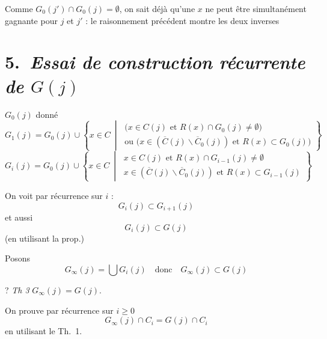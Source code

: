 \documentclass[11pt,a4paper]{article}
\begin{document}
Comme $G_0(j')\cap G_0(j)=\emptyset$, on sait déjà qu'une $x$ ne peut être simultanément gagnante pour $j$ et $j'$ : le raisonnement précédent montre   les deux inverses

\section*{ 5.\ \emph{Essai de construction récurrente de $G(j)$}}


$G_0(j)$ donné
\[
  G_1(j)=G_0(j)\cup\left\{x\in C\ \middle|\ \begin{array}{l}
    \bigl(x\in C(j) \text{ et } R(x)\cap G_0(j)\neq\emptyset\bigr)\\
    \text{ou } \bigl(x\in(\overline{C}(j)\smallsetminus\overline{C}_0(j)) \text{ et } R(x)\subset G_0(j)\bigr)
  \end{array}\right\}
\]
\[
  G_i(j)=G_0(j)\cup\left\{x\in C\ \middle|\ \begin{array}{l}
    x\in C(j) \text{ et } R(x)\cap G_{i-1}(j)\neq\emptyset\\
    x\in(\overline{C}(j)\smallsetminus\overline{C}_0(j)) \text{ et } R(x)\subset G_{i-1}(j)
  \end{array}\right\}
\]

On voit par récurrence sur $i$ :
\[
  G_i(j)\subset G_{i+1}(j)
\]
et aussi
\[
  G_i(j)\subset G(j)
\]
(en utilisant la prop.)

Posons
\[
  G_\infty(j)=\bigcup G_i(j) \quad\text{donc}\quad G_\infty(j)\subset G(j)
\]

? \emph{Th 3} $G_\infty(j)=G(j)$.


On prouve par récurrence sur $i\geqslant 0$
\[
  G_\infty(j)\cap C_i=G(j)\cap C_i
\]
en utilisant le Th.\ 1.
\end{document}
